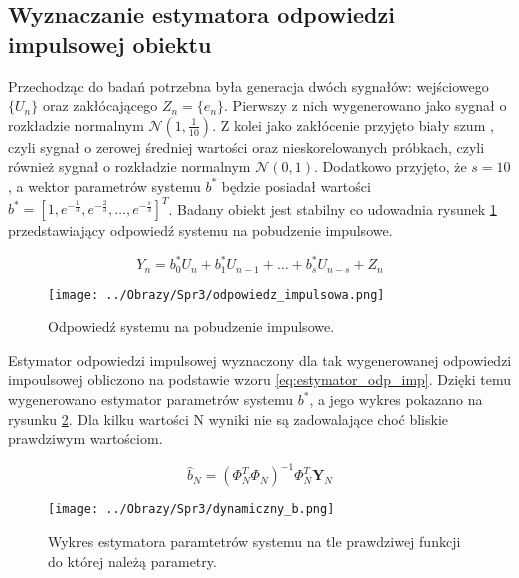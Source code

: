\documentclass[12pt,a4paper]{article}
\begin{document}
\subsection{Wyznaczanie estymatora odpowiedzi impulsowej obiektu}
Przechodząc do badań potrzebna była generacja dwóch sygnałów: wejściowego $\{U_{n}\}$ oraz zakłócającego $Z_{n}=\{e_{n}\}$. Pierwszy z nich wygenerowano jako sygnał o rozkładzie normalnym $\mathcal{N}(1,\frac{1}{10})$. Z kolei jako zakłócenie przyjęto biały szum , czyli sygnał o zerowej średniej wartości oraz nieskorelowanych próbkach, czyli również sygnał o rozkładzie normalnym $\mathcal{N}(0,1)$.
Dodatkowo przyjęto, że $s=10$, a wektor parametrów systemu $b^{*}$ będzie posiadał wartości $b^{*}=[1,e^{-\frac{1}{3}},e^{-\frac{2}{3}},\dots,e^{-\frac{s}{3}}]^{T}$.
Badany obiekt jest stabilny co udowadnia rysunek \ref{fig:dynamiczny_odp} przedstawiający odpowiedź systemu na pobudzenie impulsowe.

\begin{equation}\label{eq:dynamiczny}
Y_{n} = b_{0}^{*}U_{n} + b_{1}^{*}U_{n-1} + \dots + b_{s}^{*}U_{n-s} + Z_{n}
\end{equation}

\begin{figure}[H]
\centering
\texttt{[image: ../Obrazy/Spr3/odpowiedz\_impulsowa.png]} 
\caption{Odpowiedź systemu na pobudzenie impulsowe.}
\label{fig:dynamiczny_odp}
\end{figure}

Estymator odpowiedzi impulsowej wyznaczony dla tak wygenerowanej odpowiedzi impoulsowej obliczono na podstawie wzoru \ref{eq:estymator_odp_imp}.
Dzięki temu wygenerowano estymator parametrów systemu $b^{*}$, a jego wykres pokazano na rysunku \ref{fig:estymator_b}.
Dla kilku wartości N wyniki nie są zadowalające choć bliskie prawdziwym wartościom.

\begin{equation}\label{eq:estymator_odp_imp}
\hat{b}_{N}=(\Phi_{N}^{T}\Phi_{N})^{-1}\Phi_{N}^{T}\boldsymbol{Y}_{N}
\end{equation}

\begin{figure}[H]
\centering
\texttt{[image: ../Obrazy/Spr3/dynamiczny\_b.png]} 
\caption{Wykres estymatora paramtetrów systemu na tle prawdziwej funkcji do której należą parametry.}
\label{fig:estymator_b}
\end{figure}
\end{document}
